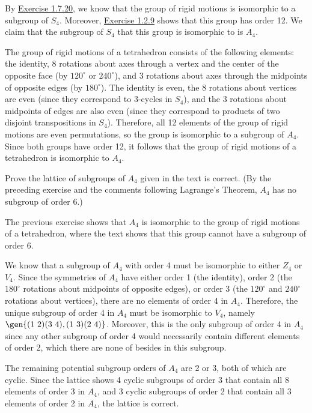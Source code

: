 \begin{sol}
    By \hyperref[ex1.7.20]{Exercise 1.7.20}, we know that the group of rigid motions is isomorphic to a subgroup of $S_4$. Moreover, \hyperref[ex1.2.9]{Exercise 1.2.9} shows that this group has order 12. We claim that the subgroup of $S_4$ that this group is isomorphic to is $A_4$. 

    The group of rigid motions of a tetrahedron consists of the following elements: the identity, 8 rotations about axes through a vertex and the center of the opposite face (by $120^\circ$ or $240^\circ$), and 3 rotations about axes through the midpoints of opposite edges (by $180^\circ$). The identity is even, the 8 rotations about vertices are even (since they correspond to $3$-cycles in $S_4$), and the 3 rotations about midpoints of edges are also even (since they correspond to products of two disjoint transpositions in $S_4$). Therefore, all 12 elements of the group of rigid motions are even permutations, so the group is isomorphic to a subgroup of $A_4$. Since both groups have order 12, it follows that the group of rigid motions of a tetrahedron is isomorphic to $A_4$.
\end{sol}

\begin{exercise}\label{ex3.5.8}
    Prove the lattice of subgroups of $A_4$ given in the text is correct. (By the preceding exercise and the comments following Lagrange's Theorem, $A_4$ has no subgroup of order $6$.)
\end{exercise}

\begin{sol}
    The previous exercise shows that $A_4$ is isomorphic to the group of rigid motions of a tetrahedron, where the text shows that this group cannot have a subgroup of order 6.

    We know that a subgroup of $A_4$ with order 4 must be isomorphic to either $Z_4$ or $V_4$. Since the symmetries of $A_4$ have either order 1 (the identity), order 2 (the $180^\circ$ rotations about midpoints of opposite edges), or order 3 (the $120^\circ$ and $240^\circ$ rotations about vertices), there are no elements of order 4 in $A_4$. Therefore, the unique subgroup of order 4 in $A_4$ must be isomorphic to $V_4$, namely $\gen{(1\ 2)(3\ 4), (1\ 3)(2\ 4)}$. Moreover, this is the only subgroup of order 4 in $A_4$ since any other subgroup of order 4 would necessarily contain different elements of order 2, which there are none of besides in this subgroup.

    The remaining potential subgroup orders of $A_4$ are 2 or 3, both of which are cyclic. Since the lattice shows 4 cyclic subgroups of order 3 that contain all 8 elements of order 3 in $A_4$, and 3 cyclic subgroups of order 2 that contain all 3 elements of order 2 in $A_4$, the lattice is correct.
\end{sol}

